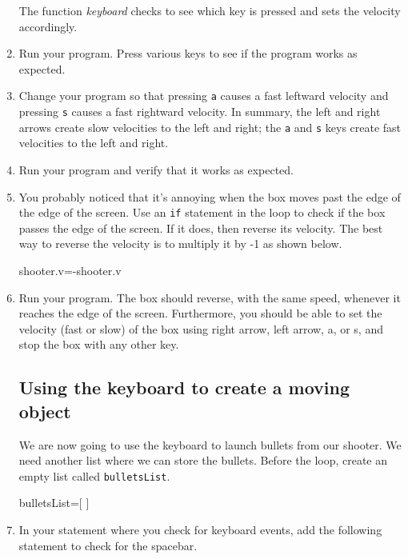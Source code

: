 \begin{enumerate}
	The function \emph{keyboard} checks to see which key is pressed and sets the velocity accordingly. 
	
	\item Run your program. Press various keys to see if the program works as expected.
	
	\item Change your program so that pressing \texttt{a} causes a fast leftward velocity and pressing \texttt{s} causes a fast rightward velocity. In summary, the left and right arrows create slow velocities to the left and right; the \texttt{a} and \texttt{s} keys create fast velocities to the left and right.
	
	\item Run your program and verify that it works as expected.

	\item You probably noticed that it's annoying when the box moves past the edge of the edge of the screen. Use an \texttt{if} statement in the  loop to check if the box passes the edge of the screen. If it does, then reverse its velocity. The best way to reverse the velocity is to multiply it by -1 as shown below.

\begin{myvpython}
            shooter.v=-shooter.v
\end{myvpython}

	\item Run your program. The box should reverse, with the same speed, whenever it reaches the edge of the screen. Furthermore, you should be able to set the velocity (fast or slow) of the box using right arrow, left arrow, a, or s, and stop the box with any other key.

	
	\subsection*{Using the keyboard to create a moving object}

We are now going to use the keyboard to launch bullets from our shooter. We need another list where we can store the bullets. Before the  loop, create an empty list called \texttt{bulletsList}.

\begin{myvpython}
bulletsList=[ ]
\end{myvpython}

	\item In your  statement where you check for keyboard events, add the following  statement to check for the spacebar.
	

\end{enumerate}
